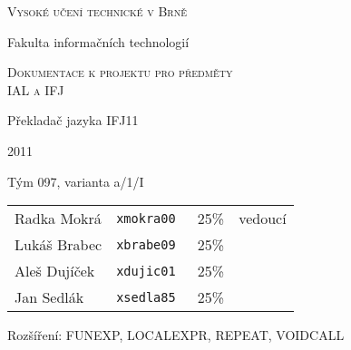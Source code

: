 \thispagestyle{empty}

\begin{center}
\Large{\scshape Vysoké učení technické v Brně}

\vspace{0.5cm}

\large{Fakulta informačních technologií}

\vfill

\Large{\scshape Dokumentace k projektu pro předměty\\IAL a IFJ}

%

\vfill

\LARGE{Překladač jazyka IFJ11}

2011

\vfill

\large{Tým 097, varianta a/1/I}
\end{center}

\vspace{0.5cm}

\begin{tabular}{l l r l}
Radka Mokrá  & \tt{xmokra00} & 25\% & vedoucí \\ 
Lukáš Brabec & \tt{xbrabe09} & 25\% & \\
Aleš Dujíček & \tt{xdujic01} & 25\% & \\
Jan Sedlák   & \tt{xsedla85} & 25\% & \\
\end{tabular}

\vspace{0.5cm}

Rozšíření: FUNEXP, LOCALEXPR, REPEAT, VOIDCALL


\newpage{}
